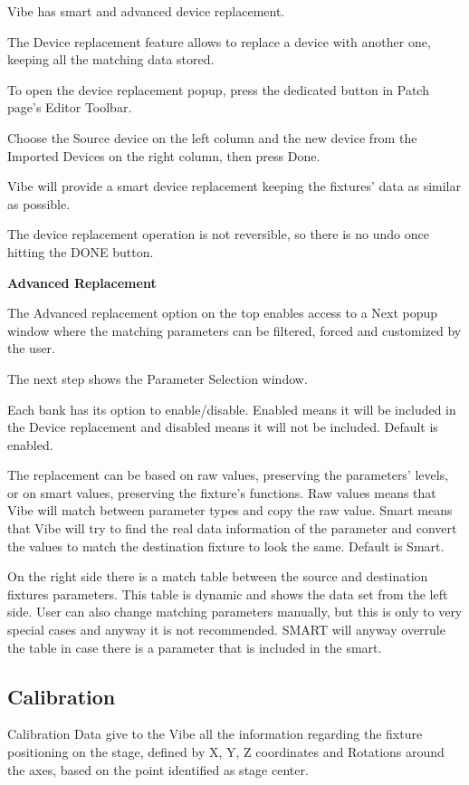 \documentclass[
]{article}
\begin{document}
Vibe has smart and advanced device replacement.

The Device replacement feature allows to replace a device with another one, keeping all the matching data stored.

To open the device replacement popup, press the dedicated button in Patch page's Editor Toolbar.

Choose the Source device on the left column and the new device from the Imported Devices on the right column, then press Done.

Vibe will provide a smart device replacement keeping the fixtures' data as similar as possible.

The device replacement operation is not reversible, so there is no undo once hitting the DONE button.

\textbf{Advanced Replacement}

The Advanced replacement option on the top enables access to a Next popup window where the matching parameters can be filtered, forced and customized by the user.

The next step shows the Parameter Selection window.

Each bank has its option to enable/disable. Enabled means it will be included in the Device replacement and disabled means it will not be included. Default is enabled.

The replacement can be based on raw values, preserving the parameters' levels, or on smart values, preserving the fixture's functions. Raw values means that Vibe will match between parameter types and copy the raw value. Smart means that Vibe will try to find the real data information of the parameter and convert the values to match the destination fixture to look the same. Default is Smart.

On the right side there is a match table between the source and destination fixtures parameters. This table is dynamic and shows the data set from the left side. User can also change matching parameters manually, but this is only to very special cases and anyway it is not recommended. SMART will anyway overrule the table in case there is a parameter that is included in the smart.

\hypertarget{Calibration-5.10}{%
\subsection{Calibration}\label{Calibration-5.10}}

Calibration Data give to the Vibe all the information regarding the fixture positioning on the stage, defined by X, Y, Z coordinates and Rotations around the axes, based on the point identified as stage center.
\end{document}
